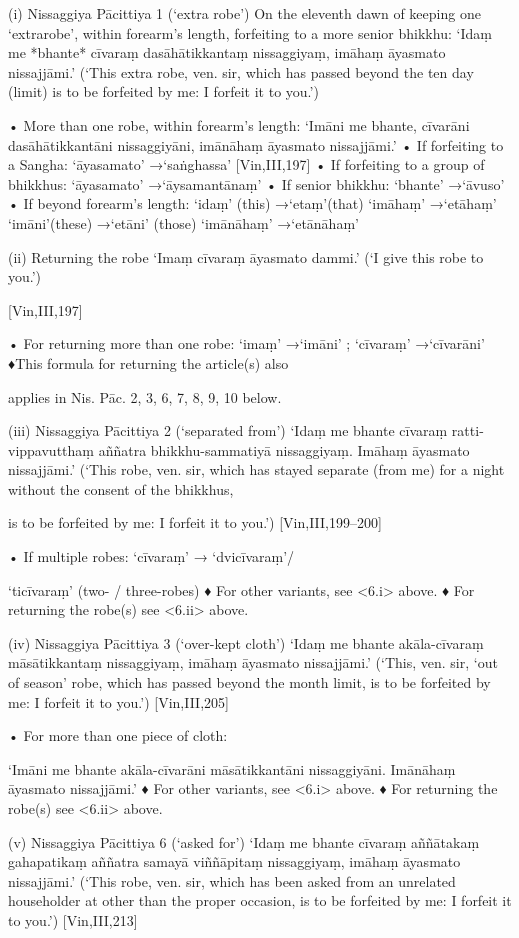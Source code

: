 (i) Nissaggiya Pācittiya 1 (‘extra robe’)
On the eleventh dawn of keeping one ‘extrarobe’, within forearm's length, forfeiting to a
more senior bhikkhu:
‘Idaṃ me *bhante* cīvaraṃ dasāhātikkantaṃ
nissaggiyaṃ, imāhaṃ āyasmato nissajjāmi.’
(‘This extra robe, ven. sir, which has passed beyond the
ten day (limit) is to be forfeited by me: I forfeit it to you.’)

• More than one robe, within forearm's
length:
‘Imāni me bhante, cīvarāni dasāhātikkantāni
nissaggiyāni, imānāhaṃ āyasmato nissajjāmi.’
• If forfeiting to a Sangha:
‘āyasamato’ →‘saṅghassa’ [Vin,III,197]
• If forfeiting to a group of bhikkhus:
‘āyasamato’ →‘āysamantānaṃ’
• If senior bhikkhu: ‘bhante’ →‘āvuso’
• If beyond forearm's length:
‘idaṃ’ (this) →‘etaṃ’(that)
‘imāhaṃ’ →‘etāhaṃ’
‘imāni’(these) →‘etāni’ (those)
‘imānāhaṃ’ →‘etānāhaṃ’

(ii) Returning the robe
‘Imaṃ cīvaraṃ āyasmato dammi.’
(‘I give this robe to you.’)

[Vin,III,197]

• For returning more than one robe:
‘imaṃ’ →‘imāni’ ; ‘cīvaraṃ’ →‘cīvarāni’
♦This formula for returning the article(s) also

applies in Nis. Pāc. 2, 3, 6, 7, 8, 9, 10 below.

(iii) Nissaggiya Pācittiya 2 (‘separated from’)
‘Idaṃ me bhante cīvaraṃ ratti-vippavutthaṃ
aññatra bhikkhu-sammatiyā nissaggiyaṃ.
Imāhaṃ āyasmato nissajjāmi.’
(‘This robe, ven. sir, which has stayed separate (from
me) for a night without the consent of the bhikkhus,

is to be forfeited by me: I forfeit it to you.’)
[Vin,III,199–200]

• If multiple robes: ‘cīvaraṃ’ → ‘dvicīvaraṃ’/

‘ticīvaraṃ’ (two- / three-robes)
♦ For other variants, see <6.i> above.
♦ For returning the robe(s) see <6.ii> above.

(iv) Nissaggiya Pācittiya 3 (‘over-kept cloth’)
‘Idaṃ me bhante akāla-cīvaraṃ
māsātikkantaṃ nissaggiyaṃ,
imāhaṃ āyasmato nissajjāmi.’
(‘This, ven. sir, ‘out of season’ robe, which has
passed beyond the month limit, is to be forfeited
by me: I forfeit it to you.’)
[Vin,III,205]

• For more than one piece of cloth:

‘Imāni me bhante akāla-cīvarāni
māsātikkantāni nissaggiyāni.
Imānāhaṃ āyasmato nissajjāmi.’
♦ For other variants, see <6.i> above.
♦ For returning the robe(s) see <6.ii> above.

(v) Nissaggiya Pācittiya 6 (‘asked for’)
‘Idaṃ me bhante cīvaraṃ aññātakaṃ
gahapatikaṃ aññatra samayā viññāpitaṃ
nissaggiyaṃ, imāhaṃ āyasmato nissajjāmi.’
(‘This robe, ven. sir, which has been asked from an
unrelated householder at other than the proper
occasion, is to be forfeited by me: I forfeit it to you.’)
[Vin,III,213]

